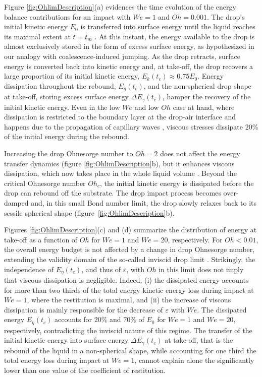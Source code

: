 \documentclass{jfm}
\newcommand{\Ohn}{\mathit{Oh}}
\newcommand{\Ohc}{\mathit{Oh}_\mathit{c}}
\newcommand{\Wen}{\mathit{We}}
\newcommand{\revRev}[1]{\textcolor{black}{#1}}
\begin{document}
Figure \ref{fig:OhlimDescription}(a) evidences the time evolution of the energy balance contributions for an impact with $\Wen=1$ and $\Ohn=0.001$.
The drop's initial kinetic energy $E_0$ is transferred into surface energy until the liquid reaches its maximal extent at \revRev{$t = t_m$  \citep[note that for $We = 1$, $t_m \approx \tau$, see][]{zhang2022impact}}. At this instant, the energy available to the drop is almost exclusively stored in the form of excess surface energy, as hypothesized in our analogy with coalescence-induced jumping.
As the drop retracts, surface energy is converted back into kinetic energy and, at take-off, the drop recovers a large proportion of its initial kinetic energy, $E_k(t_c) \approx 0.75E_0$.
Energy dissipation throughout the rebound, $E_\eta(t_c)$, and the non-spherical drop shape at take-off, storing excess surface energy $\Delta E_\gamma(t_c)$, hamper the recovery of the initial kinetic energy.
Even in the low $\Wen$ and \revRev{low} $\Ohn$ case at hand, where dissipation is restricted to the boundary layer at the drop-air interface and happens due to the propagation of capillary waves \cite[see the insets of figure~\ref{fig:OhlimDescription}(a) and][]{renardy2003pyramidal, zhang2022impact}, viscous stresses dissipate $20$\% of the initial energy during the rebound. 

Increasing the drop Ohnesorge number to $\Ohn = 2$ does not affect the energy transfer dynamics (figure \ref{fig:OhlimDescription}b), but it enhances viscous dissipation, which now takes place in the whole liquid volume \cite[see the insets of figure~\ref{fig:OhlimDescription}(b) and][]{eggers2010drop}.
Beyond the critical Ohnesorge number $\Ohc$, the initial kinetic energy is dissipated before the drop can rebound off the substrate.
The drop impact process becomes over-damped and, in this small Bond number limit, the drop slowly relaxes back to its sessile spherical shape (figure~\ref{fig:OhlimDescription}b).

Figures \ref{fig:OhlimDescription}(c) and (d) summarize the distribution of energy at take-off as a function of $\Ohn$ for $\Wen = 1$ and $\Wen = 20$, respectively.
For $\Ohn < 0.01$, the overall energy budget is not affected by a change in drop Ohnesorge number, extending the validity domain of the so-called inviscid drop limit \citep{richard2000bouncing}.  
Strikingly, the independence of $E_\eta(t_c)$, and thus of $\varepsilon$, with $\Ohn$ in this limit does not imply that viscous dissipation is negligible. 
Indeed, (i) the dissipated energy accounts for more than two thirds of the total energy kinetic energy loss during impact at $\Wen = 1$, where the restitution is maximal, and (ii) the increase of viscous dissipation is mainly responsible for the decrease of $\varepsilon$ with $\Wen$. The dissipated energy $E_\eta(t_c)$ accounts for $20\%$ and $70\%$ of $E_0$ for $\Wen = 1$ and $\Wen = 20$, respectively, contradicting the inviscid nature of this regime. The transfer of the initial kinetic energy into surface energy $\Delta E_\gamma(t_c)$ at take-off, that is the rebound of the liquid in a non-spherical shape, while accounting for one third the total energy loss during impact at $\Wen = 1$, cannot explain alone the significantly lower than one value of the coefficient of restitution. 
\end{document}
